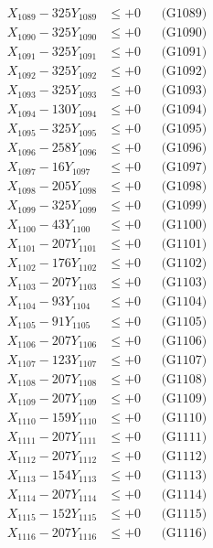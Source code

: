 \documentclass[a4paper,10pt]{article}
\begin{document}
{\begin{align}
X_{1089} - 325Y_{1089} &\leq +0 && \text{(G1089)} \\
X_{1090} - 325Y_{1090} &\leq +0 && \text{(G1090)} \\
\allowbreak
X_{1091} - 325Y_{1091} &\leq +0 && \text{(G1091)} \\
X_{1092} - 325Y_{1092} &\leq +0 && \text{(G1092)} \\
X_{1093} - 325Y_{1093} &\leq +0 && \text{(G1093)} \\
X_{1094} - 130Y_{1094} &\leq +0 && \text{(G1094)} \\
X_{1095} - 325Y_{1095} &\leq +0 && \text{(G1095)} \\
X_{1096} - 258Y_{1096} &\leq +0 && \text{(G1096)} \\
X_{1097} - 16Y_{1097} &\leq +0 && \text{(G1097)} \\
X_{1098} - 205Y_{1098} &\leq +0 && \text{(G1098)} \\
X_{1099} - 325Y_{1099} &\leq +0 && \text{(G1099)} \\
X_{1100} - 43Y_{1100} &\leq +0 && \text{(G1100)} \\
\allowbreak
X_{1101} - 207Y_{1101} &\leq +0 && \text{(G1101)} \\
X_{1102} - 176Y_{1102} &\leq +0 && \text{(G1102)} \\
X_{1103} - 207Y_{1103} &\leq +0 && \text{(G1103)} \\
X_{1104} - 93Y_{1104} &\leq +0 && \text{(G1104)} \\
X_{1105} - 91Y_{1105} &\leq +0 && \text{(G1105)} \\
X_{1106} - 207Y_{1106} &\leq +0 && \text{(G1106)} \\
X_{1107} - 123Y_{1107} &\leq +0 && \text{(G1107)} \\
X_{1108} - 207Y_{1108} &\leq +0 && \text{(G1108)} \\
X_{1109} - 207Y_{1109} &\leq +0 && \text{(G1109)} \\
X_{1110} - 159Y_{1110} &\leq +0 && \text{(G1110)} \\
\allowbreak
X_{1111} - 207Y_{1111} &\leq +0 && \text{(G1111)} \\
X_{1112} - 207Y_{1112} &\leq +0 && \text{(G1112)} \\
X_{1113} - 154Y_{1113} &\leq +0 && \text{(G1113)} \\
X_{1114} - 207Y_{1114} &\leq +0 && \text{(G1114)} \\
X_{1115} - 152Y_{1115} &\leq +0 && \text{(G1115)} \\
X_{1116} - 207Y_{1116} &\leq +0 && \text{(G1116)} \\

\end{align}}
\end{document}
